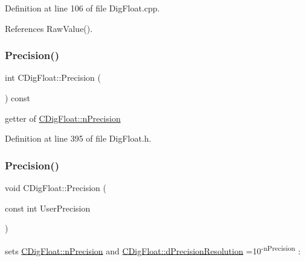 Definition at line 106 of file Dig\+Float.\+cpp.



References Raw\+Value().

\mbox{\label{classCDigFloat_ad66e2fc1bb19f491dfbc4fb7bfb20d47}} 
\subsubsection{\texorpdfstring{Precision()}{Precision()}\hspace{0.1cm}{\footnotesize\ttfamily [1/2]}}
{\footnotesize\ttfamily int C\+Dig\+Float\+::\+Precision (\begin{DoxyParamCaption}{ }\end{DoxyParamCaption}) const\hspace{0.3cm}{\ttfamily [inline]}}



getter of \hyperlink{classCDigFloat_ad580654be35246d14c91482581c0bc11}{C\+Dig\+Float\+::n\+Precision} 



Definition at line 395 of file Dig\+Float.\+h.

\mbox{\label{classCDigFloat_a6d12203e256d0fba602b3cfec37f96a6}} 
\subsubsection{\texorpdfstring{Precision()}{Precision()}\hspace{0.1cm}{\footnotesize\ttfamily [2/2]}}
{\footnotesize\ttfamily void C\+Dig\+Float\+::\+Precision (\begin{DoxyParamCaption}\item[{const int}]{User\+Precision }\end{DoxyParamCaption})\hspace{0.3cm}{\ttfamily [inline]}}



sets \hyperlink{classCDigFloat_ad580654be35246d14c91482581c0bc11}{C\+Dig\+Float\+::n\+Precision} and \hyperlink{classCDigFloat_a7f9809fa0b25da57f5c8c18a02b7d1a7}{C\+Dig\+Float\+::d\+Precision\+Resolution} =10\textsuperscript{-\/n\+Precision} \+: 


